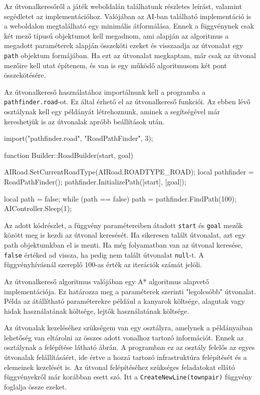 Az útvonalkeresőről a játék weboldalán találhatunk részletes leírást, valamint segédletet az implementációhoz. Valójában az AI-ban található implementáció is a weboldalon megtalálható egy minimális átformálása. Ennek a függvénynek csak két mező típusú objektumot kell megadnom, ami alapján az algoritmus a megadott paraméterek alapján összeköti ezeket és visszaadja az útvonalat egy \texttt{path} objektum formájában. Ha ezt az útvonalat megkaptam, már csak az útvonal mezőire kell utat építenem, és van is egy működő algoritmusom két pont összekötésére.

Az útvonalkereső használatához importálnunk kell a programba a \\ \texttt{pathfinder.road}-ot. Ez által érhető el az útvonalkereső funkciói. Az ebben lévő osztálynak kell egy példányát létrehoznunk, aminek a segítségével már kereshetjük is az útvonalak apróbb beállítások után.

\begin{cpp}
import("pathfinder.road", "RoadPathFinder", 3);

function Builder::RoadBuilder(start, goal) {
  AIRoad.SetCurrentRoadType(AIRoad.ROADTYPE_ROAD);
  local pathfinder = RoadPathFinder();
  pathfinder.InitializePath([start], [goal]);
  
  local path = false;
  while (path == false) {
    path = pathfinder.FindPath(100);
    AIController.Sleep(1);
  }
}
\end{cpp}

Az adott kódrészlet, a függvény paramétereiben átadott \texttt{start} és \texttt{goal} mezők között meg is kezdi az útvonal keresését. Ha sikeresen talált útvonalat, azt egy path objektumkban el is menti. Ha még folyamatban van az útvonal keresése, \texttt{false} értéked ad vissza, ha pedig nem talált útvonalat \texttt{null}-t. A függvényhívásnál szereplő 100-as érték az iterációk számát jelöli.

Az útvonalkereső algoritmus valójában egy A* algoritmus alapvető implementációja. Ez határozza meg a paraméterek szerinti "legolcsóbb" útvonalat. Példa az átállítható paraméterekre például a kanyarok költsége, alagutak vagy hidak használatának költsége, lejtők használatának költsége.


Az útvonalak kezeléséhez szükségem van egy osztályra, amelynek a példányaiban lehetőség van eltárolni az összes adott vonalhoz tartozó információt. Ennek az osztálynak a felépítése látható  ábrán. A programban ez az osztály felelős az egyes útvonalak felállításáért, ide értve a hozzá tartozó infrastruktúra felépítését és a elemeinek kezelését is. Az útvonal felépítéséhez szükséges feladatokat ellátó függvényekről már korábban esett szó. Itt a \texttt{CreateNewLine(townpair)} függvény foglalja össze ezeket.

